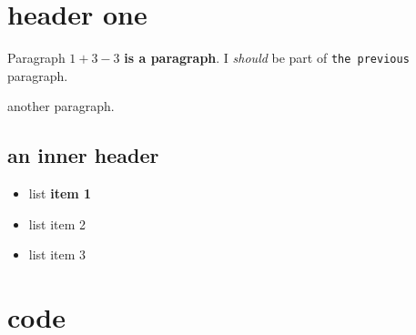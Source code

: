 \hypertarget{header-one}{%
\section{header one}\label{header-one}}

Paragraph \(1+3-3\) \textbf{is a paragraph}. I \emph{should} be part of
\texttt{the\ previous} paragraph.

another paragraph.

\hypertarget{an-inner-header}{%
\subsection{an inner header}\label{an-inner-header}}

\begin{itemize}
\tightlist
\item
  list \textbf{item 1}
\item
  list item 2
\item
  list item 3
\end{itemize}

\hypertarget{code}{%
\section{code}\label{code}}

\begin{Shaded}
\begin{Highlighting}[]
 \NormalTok{(}\NormalTok{):}
    \OperatorTok{*}
\end{Highlighting}
\end{Shaded}
